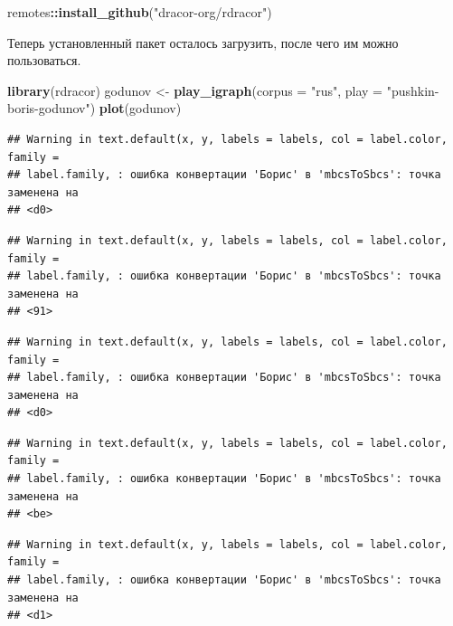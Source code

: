 \documentclass[]{book}
\newenvironment{Shaded}{\begin{snugshade}}{\end{snugshade}}
\newcommand{\KeywordTok}[1]{\textcolor[rgb]{0.13,0.29,0.53}{\textbf{#1}}}
\newcommand{\DataTypeTok}[1]{\textcolor[rgb]{0.13,0.29,0.53}{#1}}
\newcommand{\StringTok}[1]{\textcolor[rgb]{0.31,0.60,0.02}{#1}}
\newcommand{\OperatorTok}[1]{\textcolor[rgb]{0.81,0.36,0.00}{\textbf{#1}}}
\newcommand{\NormalTok}[1]{#1}
\begin{document}
\begin{Shaded}
\begin{Highlighting}[]
\NormalTok{remotes}\OperatorTok{::}\KeywordTok{install_github}\NormalTok{(}\StringTok{"dracor-org/rdracor"}\NormalTok{)}
\end{Highlighting}
\end{Shaded}

Теперь установленный пакет осталось загрузить, после чего им можно
пользоваться.

\begin{Shaded}
\begin{Highlighting}[]
\KeywordTok{library}\NormalTok{(rdracor)}
\NormalTok{godunov <-}\StringTok{ }\KeywordTok{play_igraph}\NormalTok{(}\DataTypeTok{corpus =} \StringTok{"rus"}\NormalTok{,}
                       \DataTypeTok{play =} \StringTok{"pushkin-boris-godunov"}\NormalTok{)}
\KeywordTok{plot}\NormalTok{(godunov)}
\end{Highlighting}
\end{Shaded}

\begin{verbatim}
## Warning in text.default(x, y, labels = labels, col = label.color, family =
## label.family, : ошибка конвертации 'Борис' в 'mbcsToSbcs': точка заменена на
## <d0>
\end{verbatim}

\begin{verbatim}
## Warning in text.default(x, y, labels = labels, col = label.color, family =
## label.family, : ошибка конвертации 'Борис' в 'mbcsToSbcs': точка заменена на
## <91>
\end{verbatim}

\begin{verbatim}
## Warning in text.default(x, y, labels = labels, col = label.color, family =
## label.family, : ошибка конвертации 'Борис' в 'mbcsToSbcs': точка заменена на
## <d0>
\end{verbatim}

\begin{verbatim}
## Warning in text.default(x, y, labels = labels, col = label.color, family =
## label.family, : ошибка конвертации 'Борис' в 'mbcsToSbcs': точка заменена на
## <be>
\end{verbatim}

\begin{verbatim}
## Warning in text.default(x, y, labels = labels, col = label.color, family =
## label.family, : ошибка конвертации 'Борис' в 'mbcsToSbcs': точка заменена на
## <d1>
\end{verbatim}
\end{document}
